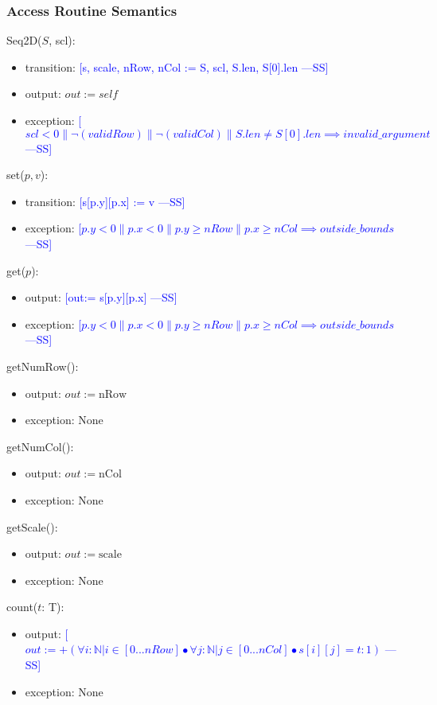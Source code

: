 \documentclass[12pt]{article}
\newcommand{\authornote}[3]{\textcolor{#1}{[#3 ---#2]}}
\newcommand{\authornote}[3]{}
\newcommand{\wss}[1]{\authornote{blue}{SS}{#1}}
\begin{document}
\subsubsection* {Access Routine Semantics}

Seq2D($S$, scl):
\begin{itemize}
\item transition: \wss{s, scale, nRow, nCol := S, scl, S.len, S[0].len}
\item output: $\mathit{out} := \mathit{self}$
\item exception: \wss{$scl < 0 \| \lnot(validRow) \| \lnot(validCol) \| S.len \neq S[0].len \implies invalid\_argument$}
\end{itemize}

\noindent set($p, v$):
\begin{itemize}
\item transition: \wss{s[p.y][p.x] := v}
\item exception: \wss{$p.y < 0 \| p.x < 0 \| p.y \geq nRow \| p.x \geq nCol \implies outside\_bounds$}
\end{itemize}

\noindent get($p$):
\begin{itemize}
\item output: \wss{out:= s[p.y][p.x]}
\item exception: \wss{$p.y < 0 \| p.x < 0 \| p.y \geq nRow \| p.x \geq nCol \implies outside\_bounds$}
\end{itemize}

\noindent getNumRow():
\begin{itemize}
\item output: $out := \mbox{nRow}$
\item exception: None
\end{itemize}

\noindent getNumCol():
\begin{itemize}
\item output: $out := \mbox{nCol}$
\item exception: None
\end{itemize}

\noindent getScale():
\begin{itemize}
\item output: $out := \mbox{scale}$
\item exception: None
\end{itemize}

\noindent count($t$: T):
\begin{itemize}
\item output: \wss{$out:= +(\forall i : \mathbb{N} | i \in [0...nRow] \bullet \forall j : \mathbb{N} | j \in [0...nCol] \bullet s[i][j] = t : 1)$}
\item exception: None
\end{itemize}
\end{document}
